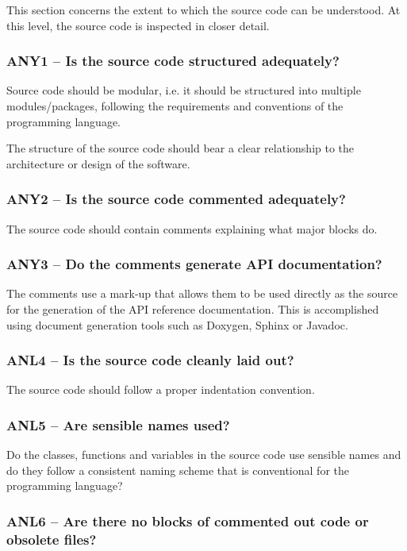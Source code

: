\documentclass[a4paper,11pt]{article}
\begin{document}
This section concerns the extent to which the source code can be understood. At
this level, the source code is inspected in closer detail.

\subsubsection{ANY1 -- Is the source code structured adequately?}

Source code should be modular, i.e. it should be structured into multiple
modules/packages, following the requirements and conventions of the programming
language. 

The structure of the source code should bear a clear relationship to the
architecture or design of the software.

\subsubsection{ANY2 -- Is the source code commented adequately?}

The source code should contain comments explaining what major blocks do.

\subsubsection{ANY3 -- Do the comments generate API documentation?}

The comments use a mark-up that allows them to be used directly as the
source for the generation of the API reference documentation. This is
accomplished using document generation tools such as Doxygen, Sphinx or
Javadoc.

\subsubsection{ANL4 -- Is the source code cleanly laid out?}

The source code should follow a proper indentation convention. 

\subsubsection{ANL5 -- Are sensible names used?}

Do the classes, functions and variables in the source code use sensible names
and do they follow a consistent naming scheme that is conventional for the
programming language?

\subsubsection{ANL6 -- Are there no blocks of commented out code or obsolete files?}
\end{document}
